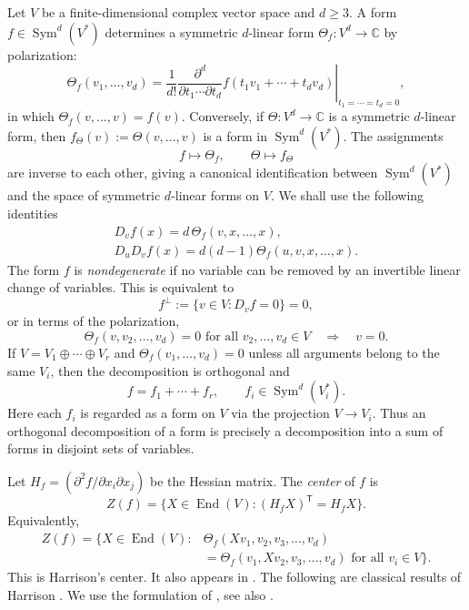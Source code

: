 \documentclass[11pt,reqno]{amsart}
\numberwithin{equation}{section}
\theoremstyle{definition}
\theoremstyle{remark}
\newcommand{\C}{\mathbb C}
\newcommand{\Sym}{\operatorname{Sym}}
\newcommand{\End}{\operatorname{End}}
\begin{document}
 Let $V$ be
a finite-dimensional complex vector space and $d\geq3$. A form $f\in\Sym^d(V^*)$ determines a symmetric $d$-linear form $\Theta_f:V^d\longrightarrow\C$ by polarization:
\begin{equation}\label{eq:polarization}
  \Theta_f(v_1,\ldots,v_d)
  =
  \frac{1}{d!}
  \left.
  \frac{\partial^d}{\partial t_1\cdots\partial t_d}
  f(t_1v_1+\cdots+t_dv_d)
  \right|_{t_1=\cdots=t_d=0},
\end{equation}
in which $\Theta_f(v,\ldots,v)=f(v)$. Conversely, if
$\Theta:V^d\to\C$ is a symmetric $d$-linear form, then $f_\Theta(v):=\Theta(v,\ldots,v)$ is a form in $\Sym^d(V^*)$. The assignments
\[
  f\longmapsto\Theta_f,
  \qquad
  \Theta\longmapsto f_\Theta
\]
are inverse to each other, giving a canonical identification between
$\Sym^d(V^*)$ and the space of symmetric $d$-linear forms on $V$. We shall use  the following identities
\begin{gather}
  D_vf(x)
  =
  d\,\Theta_f(v,x,\ldots,x), \label{eq:directional-polarization}
\\ 
D_uD_vf(x)
  =
  d(d-1)\Theta_f(u,v,x,\ldots,x)\label{eq:polarization-2}.
\end{gather}
The form $f$ is \emph{nondegenerate} if no variable can be removed by
an invertible linear change of variables.  This is equivalent to
\[
  f^\perp:=\{v\in V:D_vf=0\}=0,
\]
or in terms of the polarization,
\begin{equation}\label{eq:nondegenerate}
  \Theta_f(v,v_2,\ldots,v_d)=0
  \text{ for all }v_2,\ldots,v_d\in V
  \quad\Longrightarrow\quad v=0.
\end{equation}
If $V=V_1\oplus\cdots\oplus V_r$ and $\Theta_f(v_1,\ldots,v_d)=0$ unless all arguments belong to the
same $V_i$, then the decomposition is orthogonal and
\begin{equation}\label{eq:direct-sum}
  f=f_1+\cdots+f_r,
  \qquad f_i\in\Sym^d(V_i^*).
\end{equation}
Here each $f_i$ is regarded as a form on $V$ via the projection
$V\to V_i$.  Thus an orthogonal decomposition of a form is precisely
a decomposition into a sum of forms in disjoint sets of variables.

Let $H_f=(\partial^2f/\partial x_i\partial x_j)$ be the Hessian
matrix.  The \emph{center} of $f$ is
\begin{equation}\label{eq:center-hessian}
  Z(f)=\{X\in\End(V):(H_fX)^{\mathsf T}=H_fX\}.
\end{equation}
Equivalently,
\begin{equation}\label{eq:center-polar}
\begin{aligned}
 Z(f)=\{X\in\End(V):{}&
 \Theta_f(Xv_1,v_2,v_3,\ldots,v_d)\\
 &{}=\Theta_f(v_1,Xv_2,v_3,\ldots,v_d)
 \text{ for all }v_i\in V\}.
\end{aligned}
\end{equation}
This is Harrison's center.  It also
appears in \cite[Section~5]{Kempf}.   The following are classical results of Harrison \cite{Harrison}.  We use the
formulation of \cite[Proposition~2.1]{HLYZ}, see also
\cite{ORyanShapiro}.
\end{document}
